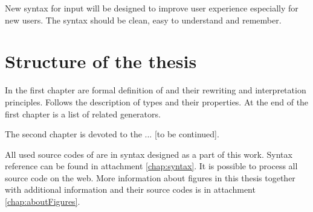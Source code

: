New syntax for input will be designed to improve user experience especially for new users.
The syntax should be clean, easy to understand and remember.


\section*{Structure of the thesis}

In the first chapter are formal definition of \lsystems and their rewriting and interpretation principles.
Follows the description of \lsystem types and their properties.
At the end of the first chapter is a list of related \lsystem generators.

The second chapter is devoted to the ... [to be continued].

All used source codes of \lsystems are in syntax designed as a part of this work.
Syntax reference can be found in attachment \ref{chap:syntax}.
It is possible to process all source code on the web.
More information about figures in this thesis together with additional information and their source codes is in attachment \ref{chap:aboutFigures}.































